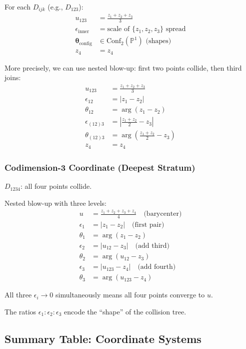 \begin{example}
For each $D_{ijk}$ (e.g., $D_{123}$):
\begin{align}
u_{123} &= \frac{z_1 + z_2 + z_3}{3}\\
\epsilon_{\text{inner}} &= \text{scale of } \{z_1, z_2, z_3\} \text{ spread}\\
\boldsymbol{\theta}_{\text{config}} &\in \text{Conf}_2(\mathbb{P}^1) \text{ (shapes)}\\
z_4 &= z_4
\end{align}

More precisely, we can use nested blow-up: first two points collide, then third joins:
\begin{align}
u_{123} &= \frac{z_1 + z_2 + z_3}{3}\\
\epsilon_{12} &= |z_1 - z_2|\\
\theta_{12} &= \arg(z_1 - z_2)\\
\epsilon_{(12)3} &= \left| \frac{z_1 + z_2}{2} - z_3 \right|\\
\theta_{(12)3} &= \arg\left(\frac{z_1 + z_2}{2} - z_3\right)\\
z_4 &= z_4
\end{align}

\subsubsection{Codimension-3 Coordinate (Deepest Stratum)}

$D_{1234}$: all four points collide.

Nested blow-up with three levels:
\begin{align}
u &= \frac{z_1 + z_2 + z_3 + z_4}{4} \quad \text{(barycenter)}\\
\epsilon_1 &= |z_1 - z_2| \quad \text{(first pair)}\\
\theta_1 &= \arg(z_1 - z_2)\\
\epsilon_2 &= |u_{12} - z_3| \quad \text{(add third)}\\
\theta_2 &= \arg(u_{12} - z_3)\\
\epsilon_3 &= |u_{123} - z_4| \quad \text{(add fourth)}\\
\theta_3 &= \arg(u_{123} - z_4)
\end{align}

All three $\epsilon_i \to 0$ simultaneously means all four points converge to $u$.

The ratios $\epsilon_1 : \epsilon_2 : \epsilon_3$ encode the ``shape'' of the collision tree.
\end{example}

\subsection{Summary Table: Coordinate Systems}

